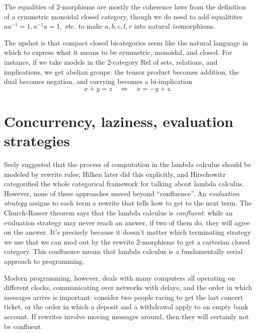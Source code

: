 \documentclass[12pt,twoside,openright]{report}
\begin{document}
The equalities of 2-morphisms are mostly the coherence laws from the definition of a symmetric monoidal closed category, though we do need to add equalitites $aa^{-1} = 1, a^{-1}a = 1,$ etc. to make $a,b,c,l,r$ into natural {\em iso}morphisms.

The upshot is that compact closed bicategories seem like the natural language in which to express what it means to be symmetric, monoidal, and closed.  For instance, if we take models in the 2-category Rel of sets, relations, and implications, we get abelian groups: the tensor product becomes addition, the dual becomes negation, and currying becomes a bi-implication
\[ x + y = z \quad \iff \quad x = -y + z. \]

\section*{Concurrency, laziness, evaluation strategies}

Seely \cite{Seely} suggested that the process of computation in the lambda calculus should be modeled by rewrite rules; Hilken \cite{Hilken} later did this explicitly, and Hirschowitz \cite{Hirschowitz} categorified the whole categorical framework for talking about lambda calculus.  However, none of these approaches moved beyond ``confluence''.  An {\sl evaluation strategy} assigns to each term a rewrite that tells how to get to the next term.  The Church-Rosser theorem says that the lambda calculus is {\sl confluent}: while an evaluation strategy may never reach an answer, if two of them do, they will agree on the answer.  It's precisely because it doesn't matter which terminating strategy we use that we can mod out by the rewrite 2-morphisms to get a cartesian closed category.  This confluence means that lambda calculus is a fundamentally serial approach to programming.

Modern programming, however, deals with many computers all operating on different clocks, communicating over networks with delays, and the order in which messages arrive is important: consider two people racing to get the last concert ticket, or the order in which a deposit and a withdrawal apply to an empty bank account.  If rewrites involve moving messages around, then they will certainly not be confluent.
\end{document}

